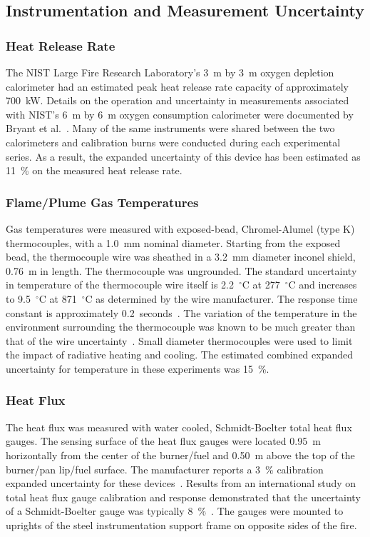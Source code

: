 \documentclass[twoside]{uocthesis}
\begin{document}
{\subsection{Instrumentation and Measurement Uncertainty}

\subsubsection{Heat Release Rate}

The NIST Large Fire Research Laboratory's 3~m by 3~m oxygen depletion calorimeter had an estimated peak heat release rate capacity of approximately 700~kW.  Details on the operation and uncertainty in measurements associated with NIST’s 6~m by 6~m oxygen consumption calorimeter were documented by Bryant et al.~\cite{Bryant:2004}. Many of the same instruments were shared between the two calorimeters and calibration burns were conducted during each experimental series.  As a result, the expanded uncertainty of this device has been estimated as 11~\% on the measured heat release rate.

\subsubsection{Flame/Plume Gas Temperatures}

Gas temperatures were measured with exposed-bead, Chromel-Alumel (type K) thermocouples, with a 1.0~mm nominal diameter.  Starting from the exposed bead, the thermocouple wire was sheathed in a 3.2~mm diameter inconel shield, 0.76~m in length. The thermocouple was ungrounded. The standard uncertainty in temperature of the thermocouple wire itself is 2.2~$^\circ$C at 277~$^\circ$C and increases to 9.5~$^\circ$C at 871~$^\circ$C as determined by the wire manufacturer.  The response time constant is approximately 0.2~seconds~\cite{Omega}.  The variation of the temperature in the environment surrounding the thermocouple was known to be much greater than that of the wire uncertainty~\cite{Blevins:1999,Pitts:2001}. Small diameter thermocouples were used to limit the impact of radiative heating and cooling.  The estimated combined expanded uncertainty for temperature in these experiments was 15~\%.

\subsubsection{Heat Flux}

The heat flux was measured with water cooled, Schmidt-Boelter total heat flux gauges. The sensing surface of the heat flux gauges were located 0.95~m horizontally from the center of the burner/fuel and 0.50~m above the top of the burner/pan lip/fuel surface.  The manufacturer reports a 3~\% calibration expanded uncertainty for these devices~\cite{Medtherm}. Results from an international study on total heat flux gauge calibration and response demonstrated that the uncertainty of a Schmidt-Boelter gauge was typically 8~\%~\cite{Pitts:2006}.  The gauges were mounted to uprights of the steel instrumentation support frame on opposite sides of the fire.

}
\end{document}
